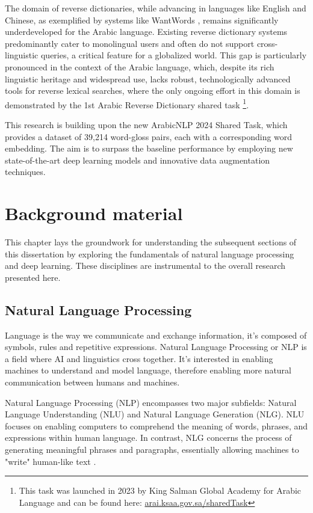 \documentclass[15pt]{article}
\begin{document}
The domain of reverse dictionaries, while advancing in languages like English and Chinese, as exemplified by systems like WantWords \cite{Qi2020}, remains significantly underdeveloped for the Arabic language. Existing reverse dictionary systems predominantly cater to monolingual users and often do not support cross-linguistic queries, a critical feature for a globalized world. This gap is particularly pronounced in the context of the Arabic language, which, despite its rich linguistic heritage and widespread use, lacks robust, technologically advanced tools for reverse lexical searches, where the only ongoing effort in this domain is demonstrated by the 1st Arabic Reverse Dictionary shared task \footnote{This task was launched in 2023 by King Salman Global Academy for Arabic Language and can be found here: \href{https://arai.ksaa.gov.sa/sharedTask/}{arai.ksaa.gov.sa/sharedTask}}.

This research is building upon the new ArabicNLP 2024 Shared Task, which provides a dataset of 39,214 word-gloss pairs, each with a corresponding word embedding. The aim is to surpass the baseline performance by employing new state-of-the-art deep learning models and innovative data augmentation techniques.


\section{Background material}

This chapter lays the groundwork for understanding the subsequent sections of this dissertation by exploring the fundamentals of natural language processing and deep learning. These disciplines are instrumental to the overall research presented here.

\subsection{Natural Language Processing}
Language is the way we communicate and exchange information, it’s composed of symbols, rules and repetitive expressions. Natural Language Processing or NLP is a field where AI and linguistics cross together. It's interested in enabling machines to understand and model language, therefore enabling more natural communication between humans and machines.

Natural Language Processing (NLP) encompasses two major subfields: Natural Language Understanding (NLU) and Natural Language Generation (NLG). NLU focuses on enabling computers to comprehend the meaning of words, phrases, and expressions within human language. In contrast, NLG concerns the process of generating meaningful phrases and paragraphs, essentially allowing machines to "write" human-like text \cite{Khurana2023}.
\end{document}
